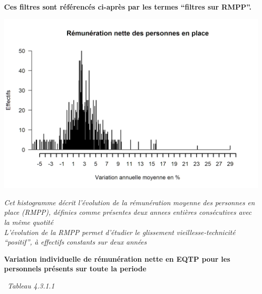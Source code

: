 \textbf{Ces filtres sont référencés ci-après par les termes ``filtres
sur RMPP''.}

\includegraphics{altair_files/figure-latex/unnamed-chunk-133-1.png}

\emph{Cet histogramme décrit l'évolution de la rémunération moyenne des
personnes en place (RMPP), définies comme présentes deux annees entières
consécutives avec la même quotité}\\
\emph{L'évolution de la RMPP permet d'étudier le glissement
vieillesse-technicité ``positif'', à effectifs constants sur deux
années}

\textbf{Variation individuelle de rémunération nette en EQTP pour les
personnels présents sur toute la periode}

~\emph{Tableau 4.3.1.1}

